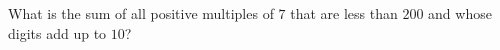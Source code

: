 What is the sum of all positive multiples of $7$ that are less than $200$ and whose digits add up to $10$?
